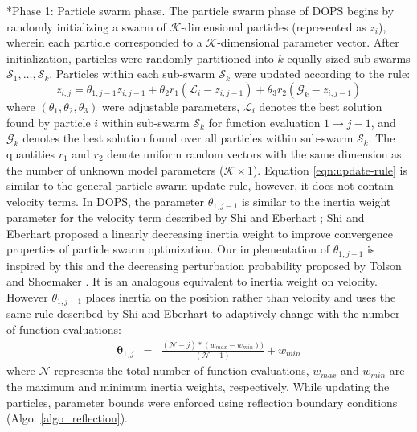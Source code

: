 \documentclass[12pt]{article}
\makeatletter
\renewcommand\subsubsection{\@startsection
	{subsubsection}{2}{0mm}
	{-0.05in}
	{-0.5\baselineskip}
	{\normalfont\normalsize\itshape}}
\makeatother
\begin{document}
\subsubsection*{Phase 1: Particle swarm phase.}
The particle swarm phase of DOPS begins by randomly initializing a swarm of $\mathcal{K}$-dimensional particles (represented as $z_{i}$),
wherein each particle corresponded to a $\mathcal{K}$-dimensional parameter vector.
After initialization, particles were randomly partitioned into $k$ equally sized sub-swarms $\mathcal{S}_{1},\hdots,\mathcal{S}_{k}$.
Particles within each sub-swarm $\mathcal{S}_{k}$ were updated according to the rule:
\begin{equation}\label{eqn:update-rule}
	{z}_{i,j} = \theta_{1,j-1}{z}_{i,j-1} + \theta_{2}{r}_{1}\left(\mathcal{L}_{i} - {z}_{i,j-1}\right) + \theta_{3}{r}_{2}\left(\mathcal{G}_{k} - {z}_{i,j-1}\right)
\end{equation}
where $\left(\theta_{1},\theta_{2},\theta_{3}\right)$ were adjustable parameters, $\mathcal{L}_{i}$ denotes the best solution found by particle $i$ within sub-swarm
$\mathcal{S}_{k}$ for function evaluation $1\rightarrow j-1$, and
$\mathcal{G}_{k}$ denotes the best solution found over all particles within sub-swarm $\mathcal{S}_{k}$.
The quantities $r_{1}$ and $r_{2}$ denote uniform random vectors with the same dimension as the number of unknown model parameters ($\mathcal{K}\times{1}$).
Equation \eqref{eqn:update-rule} is similar to the general particle swarm update rule, however, it does not contain velocity terms.
In DOPS, the parameter $\theta_{1,j-1}$ is similar to the inertia weight parameter for the velocity term described by Shi and Eberhart \cite{shi1999empirical};
Shi and Eberhart proposed a linearly decreasing inertia weight to improve convergence properties of particle swarm optimization.
Our implementation of $\theta_{1,j-1}$ is inspired by this and the decreasing perturbation probability proposed by Tolson and Shoemaker \cite{tolson2007dynamically}.
It is an analogous equivalent to inertia weight on velocity.
However $\theta_{1,j-1}$ places inertia on the position rather than velocity and uses the same rule described by Shi and Eberhart to adaptively change with the number of function evaluations:
\begin{eqnarray}
	\mathbf \theta_{1,j}&=&\frac{(\mathcal{N}-{j})*({w}_{max}-{w}_{min}))}{(\mathcal{N}-{1})} + {w}_{min}
\end{eqnarray}
where $\mathcal{N}$ represents the total number of function evaluations, ${w}_{max}$ and ${w}_{min}$ are the maximum and minimum inertia weights, respectively.
While updating the particles, parameter bounds were enforced using reflection boundary conditions (Algo. \ref{algo_reflection}).
\end{document}

